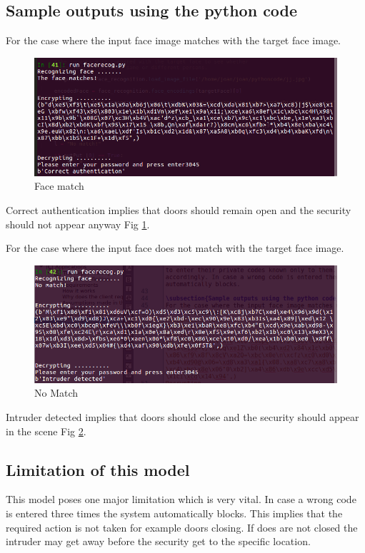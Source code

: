 \subsection{Sample outputs using the python code}
For the case where the input face image matches with the target face image.
\begin{figure}
\includegraphics[scale=0.5]{images/facematch.png} 
\caption{Face match}
\label{fig4: Output when the images match.}
\end{figure}
Correct authentication implies that doors should remain open and the security should not appear anyway Fig \ref{fig4: Output when the images match.}.

For the case where the input face does not match with the target face image.
\begin{figure}
\includegraphics[scale=0.5]{images/Nomatch.png} 
\caption{No Match}
\label{fig5 :  Output when the images do not match.}
\end{figure}
Intruder detected implies that doors should close and the security should appear in the scene
Fig \ref{fig5 :  Output when the images do not match.}.

\subsection{Limitation of this model}
This model poses one major limitation which is very vital. In case a wrong code is entered three times the system automatically blocks. This implies that the required action is not taken for example doors closing. If does are not closed the intruder may get away before the security get to the specific location.  


